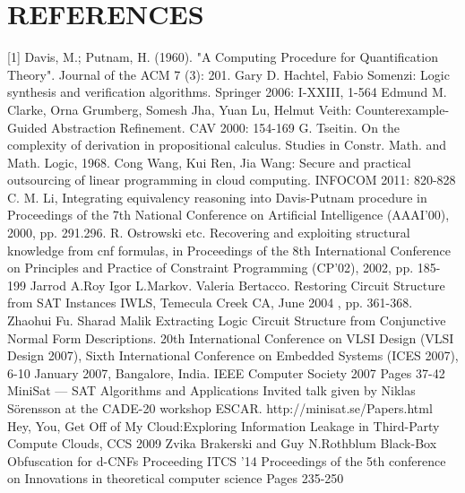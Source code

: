 \documentclass[runningheads,a4paper]{llncs}
\begin{document}
\section{REFERENCES} 
[1]	Davis, M.; Putnam, H. (1960). "A Computing Procedure for Quantification Theory". Journal of the ACM 7 (3): 201.
\newline [2]	Gary D. Hachtel, Fabio Somenzi: Logic synthesis and verification algorithms. Springer 2006: I-XXIII, 1-564
\newline [3]	Edmund M. Clarke, Orna Grumberg, Somesh Jha, Yuan Lu, Helmut Veith: Counterexample-Guided Abstraction Refinement. CAV 2000: 154-169
\newline [4]	G. Tseitin. On the complexity of derivation in propositional calculus. Studies in Constr. Math. and Math. Logic, 1968.
\newline[5]	Cong Wang, Kui Ren, Jia Wang: Secure and practical outsourcing of linear programming in cloud computing. INFOCOM 2011: 820-828
\newline[6]	C. M. Li, Integrating equivalency reasoning into Davis-Putnam procedure in Proceedings of the 7th National Conference on Artificial Intelligence (AAAI'00), 2000, pp. 291.296.
\newline[7]	R. Ostrowski etc. Recovering and exploiting structural knowledge from cnf formulas, in Proceedings of the 8th International Conference on Principles and Practice of Constraint Programming (CP'02), 2002, pp. 185-199
\newline[8]	Jarrod A.Roy Igor L.Markov. Valeria Bertacco. Restoring Circuit Structure from SAT Instances IWLS, Temecula Creek CA, June 2004 , pp. 361-368.
\newline[9]	Zhaohui Fu. Sharad Malik Extracting Logic Circuit Structure from Conjunctive Normal Form Descriptions. 20th International Conference on VLSI Design (VLSI Design 2007), Sixth International Conference on Embedded Systems (ICES 2007), 6-10 January 2007, Bangalore, India. IEEE Computer Society 2007 Pages 37-42
\newline[10]	MiniSat — SAT Algorithms and Applications Invited talk given by Niklas Sörensson at the CADE-20 workshop ESCAR. http://minisat.se/Papers.html
\newline[11]	Hey, You, Get Off of My Cloud:Exploring Information Leakage in Third-Party Compute Clouds, CCS 2009
\newline[12]	Zvika Brakerski and Guy N.Rothblum Black-Box Obfuscation for d-CNFs  Proceeding ITCS '14 Proceedings of the 5th conference on Innovations in theoretical computer science Pages 235-250 
\end{document}
